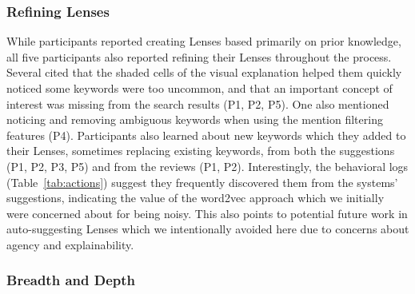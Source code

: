 \documentclass{sigchi}
\begin{document}





\subsubsection{Refining Lenses}

While participants reported creating Lenses based primarily on prior knowledge, all five participants also reported refining their Lenses throughout the process. Several cited that the shaded cells of the visual explanation helped them quickly noticed some keywords were too uncommon, and that an important concept of interest was missing from the search results (P1, P2, P5). One also mentioned noticing and removing ambiguous keywords when using the mention filtering features (P4). Participants also learned about new keywords which they added to their Lenses, sometimes replacing existing keywords, from both the suggestions (P1, P2, P3, P5) and from the reviews (P1, P2). Interestingly, the behavioral logs (Table~\ref{tab:actions}) suggest they frequently discovered them from the systems' suggestions, indicating the value of the word2vec approach which we initially were concerned about for being noisy. This also points to potential future work in auto-suggesting Lenses which we intentionally avoided here due to concerns about agency and explainability. 

\subsubsection{Breadth and Depth}
\end{document}
